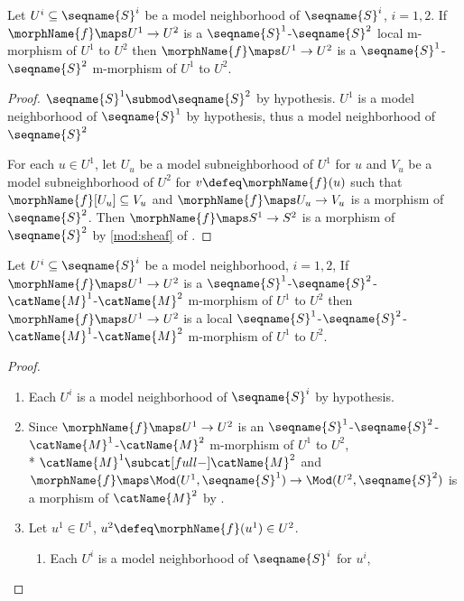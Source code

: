 \documentclass{article}
\begin{document}
\begin{lemma}
\begin{enumerate}
\item
\label{M-morph:openlocalismorph}
Let $U^i \subseteq \seqname{S}^i$ be a model neighborhood of
$\seqname{S}^i$, $i=1,2$. If $\morphName{f} \maps U^1 \to U^2$ is a
$\seqname{S}^1$-$\seqname{S}^2$ local m-morphism of $U^1$ to
$U^2$ then $\morphName{f} \maps U^1 \to U^2$ is a
$\seqname{S}^1$-$\seqname{S}^2$ m-morphism of $U^1$ to $U^2$.

\begin{proof}
$\seqname{S}^1 \submod \seqname{S}^2$ by hypothesis.
$U^1$ is a model neighborhood of $\seqname{S}^1$ by hypothesis, thus a
model neighborhood of $\seqname{S}^2$
\item
For each $u \in U^1$, let $U_u$ be a model subneighborhood of $U^1$  for
$u$ and $V_u$ be a model subneighborhood of $U^2$ for
$v \defeq \morphName{f}(u)$ such that $\morphName{f}[U_u] \subseteq V_u$
and $\morphName{f} \maps U_u \to  V_u$ is a morphism of $\seqname{S}^2$.
Then $\morphName{f} \maps S^1 \to S^2$ is a morphism of $\seqname{S}^2$
by
{
  \showlabelsinline
  \cref{mod:sheaf}
}
of .
\end{proof}

\item
\label{M-morph:opencatmorphislocal}
Let $U^i \subseteq \seqname{S}^i$ be a model neighborhood, $i=1,2$, If
$\morphName{f} \maps U^1 \to U^2$ is a
$\seqname{S}^1$-$\seqname{S}^2$-$\catName{M}^1$-$\catName{M}^2$
m-morphism of $U^1$ to $U^2$ then $\morphName{f} \maps U^1 \to U^2$ is a
local
$\seqname{S}^1$-$\seqname{S}^2$-$\catName{M}^1$-$\catName{M}^2$
m-morphism of $U^1$ to $U^2$.

\begin{proof}
\leavevmode
\begin{enumerate}
\item
Each $U^i$ is a model neighborhood of $\seqname{S}^i$ by hypothesis.

\item
Since $\morphName{f} \maps U^1 \to U^2$ is an
$\seqname{S}^1$-$\seqname{S}^2$-$\catName{M}^1$-$\catName{M}^2$
m-morphism of $U^1$ to $U^2$, \\*
\nobreaks
  {
    $\catName{M}^1 \subcat[full-] \catName{M}^2$
  }
and
$
  \morphName{f} \maps \Mod(U^1,\seqname{S}^1)
  \to \Mod(U^2,\seqname{S}^2)
$
is a morphism of $\catName{M}^2$ by .

\item
Let $u^1 \in U^1$, $u^2 \defeq \morphName{f}(u^1) \in U^2$.

\begin{enumerate}
\item
Each $U^i$ is a model neighborhood of $\seqname{S}^i$ for $u^i$,


\end{enumerate}
\end{enumerate}
\end{proof}
\end{enumerate}
\end{lemma}
\end{document}
